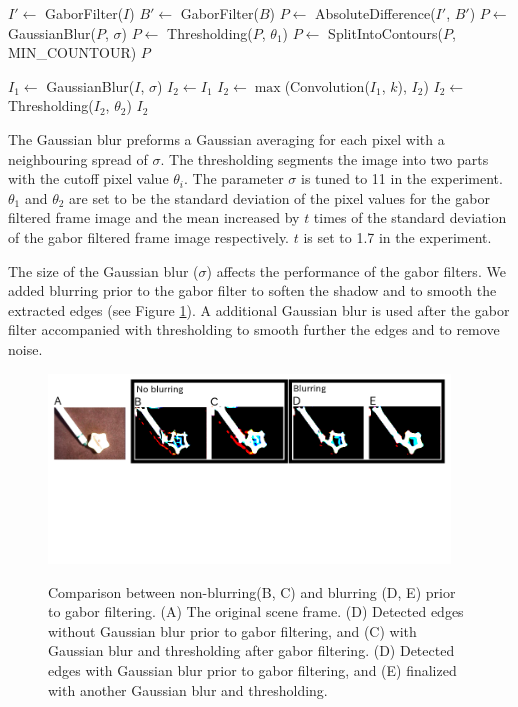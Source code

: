 \documentclass{article}
\begin{document}
\begin{algorithmic}[H]
		\State $I' \leftarrow$ GaborFilter($I$)
		\State $B' \leftarrow$ GaborFilter($B$)
		\State $P \leftarrow$ AbsoluteDifference($I'$, $B'$)
		\State $P \leftarrow$ GaussianBlur($P$, $\sigma$)
		\State $P \leftarrow$ Thresholding($P$, $\theta_1$)
		\State $P \leftarrow$ SplitIntoContours($P$, MIN\_COUNTOUR)
		\State \Return $P$
	\EndFunction 
\end{algorithmic}

\begin{algorithmic}[H]
		\State $I_1 \leftarrow$ GaussianBlur($I$, $\sigma$)
		\State $I_2 \leftarrow I_1$
			\State $I_2 \leftarrow \max$(Convolution($I_1$, $k$), $I_2$)
		\EndFor
		\State $I_2 \leftarrow$ Thresholding($I_2$, $\theta_2$)
		\State \Return $I_2$
	\EndFunction
	
\end{algorithmic}

The Gaussian blur preforms a Gaussian averaging for each pixel with a neighbouring spread of $\sigma$. The thresholding segments the image into two parts with the cutoff pixel value $\theta_i$. The parameter $\sigma$ is tuned to 11 in the experiment. $\theta_1$ and $\theta_2$ are set to be the standard deviation of the pixel values for the gabor filtered frame image and the mean increased by $t$ times of the standard deviation of the gabor filtered frame image respectively. $t$ is set to 1.7 in the experiment. 

The size of the Gaussian blur ($\sigma$) affects the performance of the gabor filters. We added blurring prior to the gabor filter to soften the shadow and to smooth the extracted edges (see Figure \ref{figure:gaussian_blur}). A additional Gaussian blur is used after the gabor filter accompanied with thresholding to smooth further the edges and to remove noise. 

\begin{figure}[tbp]
\begin{center}
\caption{Comparison between non-blurring(B, C) and blurring (D, E) prior to gabor filtering. (A) The original scene frame.  (D) Detected edges without Gaussian blur prior to gabor filtering, and (C) with Gaussian blur and thresholding after gabor filtering. (D) Detected edges with Gaussian blur prior to gabor filtering, and (E) finalized with another Gaussian blur and thresholding.}
  \includegraphics[width=0.95\textwidth]{2}
\label{figure:gaussian_blur}
\end{center}
\end{figure}
\end{document}

